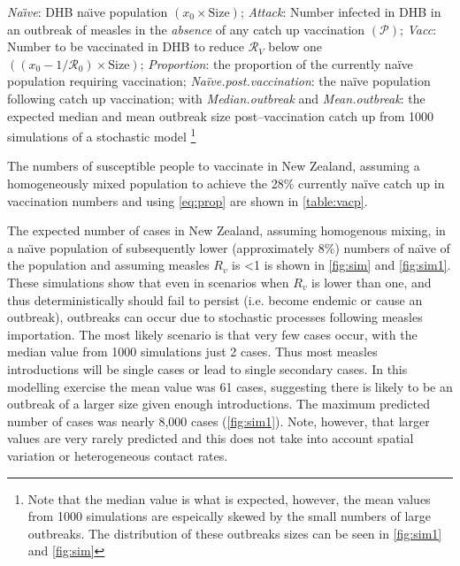 \documentclass{article}
\newcommand{\Pe}{\mathcal{P}}
\newcommand{\Ro}{\mathcal{R}_0}
\newcommand{\Rr}{\mathcal{R}}
\begin{document}
\begin{table}
{\textit{Na\"{\i}ve}:	DHB na\"{\i}ve population $\left(x_0\times\text{Size}\right)$;		
\textit{Attack}: Number infected in DHB in an outbreak of measles in the \textit{absence} of any catch up vaccination $\left(\Pe\right)$;
\textit{Vacc}: Number to be vaccinated in DHB to reduce $\Rr_V$ below one  $\left(\left(x_0-1/\Ro\right)\times\text{Size}\right)$; \textit{Proportion}: the proportion of the currently na\"{i}ve population requiring vaccination; \textit{Na\"{i}ve.post.vaccination}: the na\"{i}ve population following catch up vaccination; with \textit{Median.outbreak} and \textit{Mean.outbreak}: the expected median and mean outbreak size post--vaccination catch up from 1000 simulations of a stochastic model}
\footnote{Note that the median value is what is expected, however, the mean values from 1000 simulations are espeically skewed by the small numbers of large outbreaks. The distribution of these outbreaks sizes can be seen in \autoref{fig:sim1} and \autoref{fig:sim}}
\label{table:vacp}
\end{table}

The numbers of susceptible people to vaccinate in New Zealand, assuming a homogeneously mixed population to achieve the 28\% currently na\"{i}ve catch up in vaccination numbers and using \autoref{eq:prop} are shown in \autoref{table:vacp}.

The expected number of cases in New Zealand, assuming homogenous mixing, in a na\"{\i}ve population of subsequently lower (approximately 8\%) numbers of na\"{\i}ve of the population and assuming measles $R_v$ is <1 is shown in \autoref{fig:sim} and \autoref{fig:sim1}. These simulations show that even in scenarios when $R_v$ is lower than one, and thus deterministically should fail to persist (i.e. become endemic or cause an outbreak), outbreaks can occur due to stochastic processes following measles importation. The most likely scenario is that very few cases occur, with the median value from 1000 simulations just 2 cases. Thus most measles introductions will be single cases or lead to single secondary cases. In this modelling exercise the mean value was 61 cases, suggesting there is likely to be an outbreak of a larger size given enough introductions. The maximum predicted number of cases was nearly 8,000 cases (\autoref{fig:sim1}). Note, however, that larger values are very rarely predicted and this does not take into account spatial variation or heterogeneous contact rates.
\end{document}
